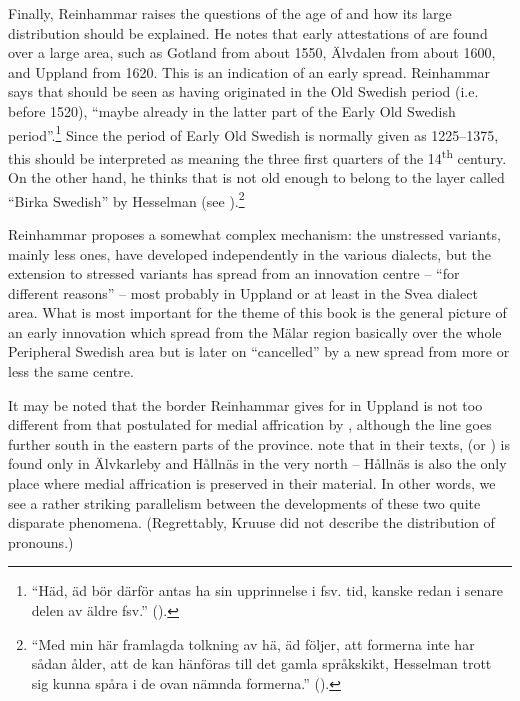 Finally, Reinhammar raises the questions of the age of  and how its large distribution should be explained. He notes that early attestations of  are found over a large area, such as Gotland from about 1550, Älvdalen from about 1600, and Uppland from 1620. This is an indication of an early spread. Reinhammar says that  should be seen as having originated in the Old Swedish period (i.e. before 1520), “maybe already in the latter part of the Early Old Swedish period”.\footnote{ “Häd, äd bör därför antas ha sin upprinnelse i fsv. tid, kanske redan i senare delen av äldre fsv.” (\citealt[189]{Reinhammar1975}).} Since the period of Early Old Swedish is normally given as 1225--1375, this should be interpreted as meaning the three first quarters of the 14\textsuperscript{th} century. On the other hand, he thinks that is not old enough to belong to the layer called “Birka Swedish” by Hesselman (see ).\footnote{ “Med min här framlagda tolkning av hä, äd följer, att formerna inte har sådan ålder, att de kan hänföras till det gamla språkskikt, Hesselman trott sig kunna spåra i de ovan nämnda formerna.” (\citealt[190]{Reinhammar1975}).} 

Reinhammar proposes a somewhat complex mechanism: the unstressed variants, mainly less ones, have developed independently in the various dialects, but the extension to stressed variants has spread from an innovation centre – “for different reasons” –  most probably in Uppland or at least in the Svea dialect area. What is most important for the theme of this book is the general picture of an early innovation which spread from the Mälar region basically over the whole Peripheral Swedish area but is later on “cancelled” by a new spread from more or less the same centre. 

It may be noted that the border Reinhammar gives for  in Uppland is not too different from that postulated for medial affrication by \citet{Kruuse1908}, although the  line goes further south in the eastern parts of the province. \citet{KällskogEtAl1993} note that in their texts,  (or ) is found only in Älvkarleby and Hållnäs in the very north – Hållnäs is also the only place where medial affrication is preserved in their material. In other words, we see a rather striking parallelism between the developments of these two quite disparate phenomena. (Regrettably, Kruuse did not describe the distribution of pronouns.)

